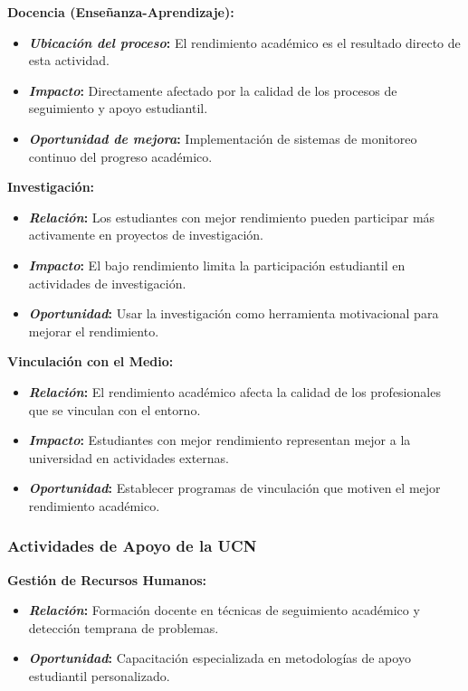 \documentclass[12pt,letterpaper]{report}
\begin{document}
\textbf{Docencia (Enseñanza-Aprendizaje):}
\begin{itemize}
    \item \textbf{\textit{Ubicación del proceso}:} El rendimiento académico es el resultado directo de esta actividad.
    \item \textbf{\textit{Impacto}:} Directamente afectado por la calidad de los procesos de seguimiento y apoyo estudiantil.
    \item \textbf{\textit{Oportunidad de mejora}:} Implementación de sistemas de monitoreo continuo del progreso académico.
\end{itemize}

\textbf{Investigación:}
\begin{itemize}
    \item \textbf{\textit{Relación}:} Los estudiantes con mejor rendimiento pueden participar más activamente en proyectos de investigación.
    \item \textbf{\textit{Impacto}:} El bajo rendimiento limita la participación estudiantil en actividades de investigación.
    \item \textbf{\textit{Oportunidad}:} Usar la investigación como herramienta motivacional para mejorar el rendimiento.
\end{itemize}

\textbf{Vinculación con el Medio:}
\begin{itemize}
    \item \textbf{\textit{Relación}:} El rendimiento académico afecta la calidad de los profesionales que se vinculan con el entorno.
    \item \textbf{\textit{Impacto}:} Estudiantes con mejor rendimiento representan mejor a la universidad en actividades externas.
    \item \textbf{\textit{Oportunidad}:} Establecer programas de vinculación que motiven el mejor rendimiento académico.
\end{itemize}

\subsubsection{Actividades de Apoyo de la UCN}

\textbf{Gestión de Recursos Humanos:}
\begin{itemize}
    \item \textbf{\textit{Relación}:} Formación docente en técnicas de seguimiento académico y detección temprana de problemas.
    \item \textbf{\textit{Oportunidad}:} Capacitación especializada en metodologías de apoyo estudiantil personalizado.
\end{itemize}
\end{document}
